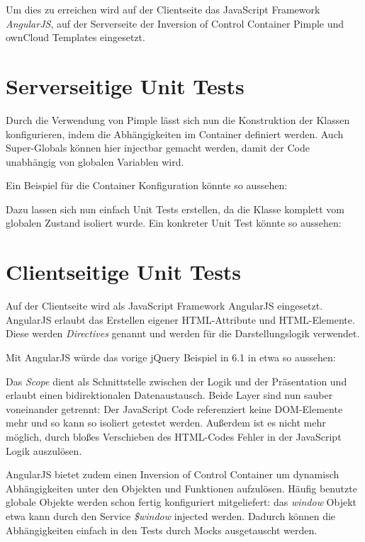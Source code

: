 \documentclass[a4paper,bibtotoc,oneside]{scrbook}
\begin{document}
Um dies zu erreichen wird auf der Clientseite das JavaScript Framework \emph{AngularJS}\cite{angular}, auf der Serverseite der Inversion of Control Container Pimple\cite{pimple} und ownCloud Templates eingesetzt.


\section{Serverseitige Unit Tests}
Durch die Verwendung von Pimple lässt sich nun die Konstruktion der Klassen konfigurieren, indem die Abhängigkeiten im Container definiert werden. Auch Super-Globals können hier injectbar gemacht werden, damit der Code unabhängig von globalen Variablen wird. 

Ein Beispiel für die Container Konfiguration könnte so aussehen:


Dazu lassen sich nun einfach Unit Tests erstellen, da die Klasse komplett vom globalen Zustand isoliert wurde. Ein konkreter Unit Test könnte so aussehen:





\section{Clientseitige Unit Tests}
Auf der Clientseite wird als JavaScript Framework AngularJS eingesetzt. AngularJS erlaubt das Erstellen eigener HTML-Attribute und HTML-Elemente. Diese werden \emph{Directives} genannt und werden für die Darstellungslogik verwendet.

Mit AngularJS würde das vorige jQuery Beispiel in 6.1 in etwa so aussehen:




Das \emph{Scope} dient als Schnittstelle zwischen der Logik und der Präsentation und erlaubt einen bidirektionalen Datenaustausch. Beide Layer sind nun sauber voneinander getrennt: Der JavaScript Code referenziert keine DOM-Elemente mehr und so kann so isoliert getestet werden. Außerdem ist es nicht mehr möglich, durch bloßes Verschieben des HTML-Codes Fehler in der JavaScript Logik auszulösen.

AngularJS bietet zudem einen Inversion of Control Container um dynamisch Abhängigkeiten unter den Objekten und Funktionen aufzulösen. Häufig benutzte globale Objekte werden schon fertig konfiguriert mitgeliefert: das \emph{window} Objekt etwa kann durch den Service \emph{\$window} injected werden. Dadurch können die Abhängigkeiten einfach in den Tests durch Mocks ausgetauscht werden.
\end{document}
